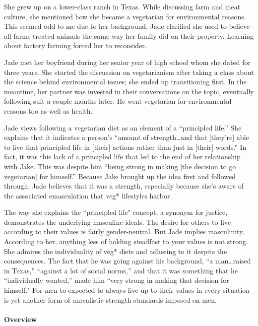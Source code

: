 \documentclass[twoside]{report}
\begin{document}
\begin{multicols*}{2}
She grew up on a lower-class ranch in Texas. While discussing farm and meat culture, she mentioned how she became a vegetarian for environmental reasons.
This seemed odd to me due to her background. Jade clarified she used to believe all farms treated animals the same way her family did on their property. Learning about factory farming forced her to reconsider.

Jade met her boyfriend during her senior year of high school whom she dated for three years. She started the discussion on vegetarianism after taking a class about the science behind environmental issues; she ended up transitioning first. In the meantime, her partner was invested in their conversations on the topic, eventually following suit a couple months later. He went vegetarian for environmental reasons too as well as health.

Jade views following a vegetarian diet as an element of a ``principled
life.'' She explains that it indicates a person's
``amount of strength\ldots{}and that {[}they're{]} able to live that
principled life in {[}their{]} actions rather than just in {[}their{]}
words.'' In fact, it was this lack of a principled life that led to the
end of her relationship with Jake. This was despite him ``being strong
in making {[}the decision to go vegetarian{]} for himself.'' Because
Jake brought up the idea first and followed through, Jade believes that
it was a strength, especially because she's aware of the associated
emasculation that veg* lifestyles harbor.

The way she explains the ``principled life" concept, a synonym for
justice, demonstrates the underlying masculine ideals. The desire for
others to live according to their values is fairly gender-neutral. But Jade implies masculinity. According to her, anything less of holding steadfast to your values is not strong. She admires the individuality of veg* diets and adhering to it despite the consequences. The fact that he was going against his background, ``a man\ldots{}raised in Texas,'' ``against a lot of social
norms,'' and that it was something that he ``individually wanted,'' made
him ``very strong in making that decision for himself." For men to expected to always live up to their values in every situation is yet another form of unrealistic strength standards imposed on men.

\paragraph{Overview}


\end{multicols*}
\end{document}
